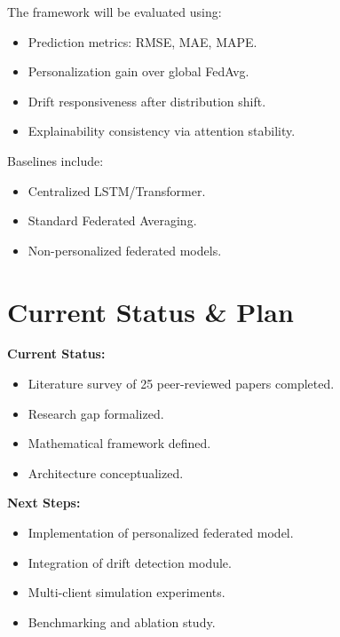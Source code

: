 \documentclass[11pt, a4paper]{article}
\begin{document}
The framework will be evaluated using:

\begin{itemize}[noitemsep]
\item Prediction metrics: RMSE, MAE, MAPE.
\item Personalization gain over global FedAvg.
\item Drift responsiveness after distribution shift.
\item Explainability consistency via attention stability.
\end{itemize}

Baselines include:

\begin{itemize}[noitemsep]
\item Centralized LSTM/Transformer.
\item Standard Federated Averaging.
\item Non-personalized federated models.
\end{itemize}


\section{Current Status \& Plan}

\textbf{Current Status:}

\begin{itemize}[noitemsep]
\item Literature survey of 25 peer-reviewed papers completed.
\item Research gap formalized.
\item Mathematical framework defined.
\item Architecture conceptualized.
\end{itemize}

\textbf{Next Steps:}

\begin{itemize}[noitemsep]
\item Implementation of personalized federated model.
\item Integration of drift detection module.
\item Multi-client simulation experiments.
\item Benchmarking and ablation study.
\end{itemize}


\nocite{*}
\renewcommand{\refname}{\normalsize References}


\end{document}
